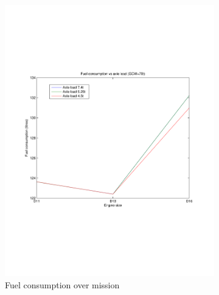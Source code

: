 \documentclass{article}
\begin{document}
\begin{figure}[h!]
\begin{subfigure}{.5\textwidth}
	\centering
	\includegraphics[width=\linewidth, clip=true, trim=45 185 65 206]{Figures/Effect_of_axle_load/Fuel_consumption_vs_axle_load_and_engine_size.pdf}
	\caption{Fuel consumption over mission}
\end{subfigure}
\begin{subfigure}{.5\textwidth}
	\centering

\end{subfigure}
\end{figure}
\end{document}
